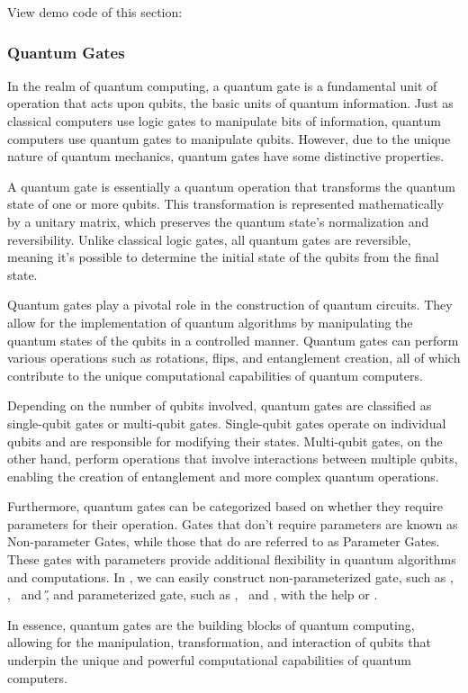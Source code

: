 View demo code of this section: 

\subsubsection{Quantum Gates}
In the realm of quantum computing, a quantum gate is a fundamental unit of operation that acts upon qubits, the basic units of quantum information. Just as classical computers use logic gates to manipulate bits of information, quantum computers use quantum gates to manipulate qubits. However, due to the unique nature of quantum mechanics, quantum gates have some distinctive properties.

A quantum gate is essentially a quantum operation that transforms the quantum state of one or more qubits. This transformation is represented mathematically by a unitary matrix, which preserves the quantum state's normalization and reversibility. Unlike classical logic gates, all quantum gates are reversible, meaning it's possible to determine the initial state of the qubits from the final state.

Quantum gates play a pivotal role in the construction of quantum circuits. They allow for the implementation of quantum algorithms by manipulating the quantum states of the qubits in a controlled manner. Quantum gates can perform various operations such as rotations, flips, and entanglement creation, all of which contribute to the unique computational capabilities of quantum computers.

Depending on the number of qubits involved, quantum gates are classified as single-qubit gates or multi-qubit gates. Single-qubit gates operate on individual qubits and are responsible for modifying their states. Multi-qubit gates, on the other hand, perform operations that involve interactions between multiple qubits, enabling the creation of entanglement and more complex quantum operations.

Furthermore, quantum gates can be categorized based on whether they require parameters for their operation. Gates that don't require parameters are known as Non-parameter Gates, while those that do are referred to as Parameter Gates. These gates with parameters provide additional flexibility in quantum algorithms and computations. In \MindQuantum, we can easily construct non-parameterized gate, such as \X, \Y, \Z\ and \H, and parameterized gate, such as \RX, \RY\ and \RZ, with the help or \ParameterResolver.

In essence, quantum gates are the building blocks of quantum computing, allowing for the manipulation, transformation, and interaction of qubits that underpin the unique and powerful computational capabilities of quantum computers.

